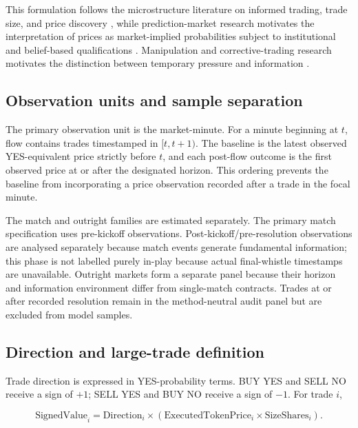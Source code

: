 This formulation follows the microstructure literature on informed trading, trade size, and price discovery \citep{kyle1985continuous,easleyohara1987tradesize,hasbrouck1991information,madhavan1997prices}, while prediction-market research motivates the interpretation of prices as market-implied probabilities subject to institutional and belief-based qualifications \citep{wolferszitzewitz2004prediction,manski2006interpreting}. Manipulation and corrective-trading research motivates the distinction between temporary pressure and information \citep{allengale1992manipulation,camerer1998racetrack,hanson2006aggregation}.

\subsection{Observation units and sample separation}

The primary observation unit is the market-minute. For a minute beginning at
$t$, flow contains trades timestamped in $[t,t+1)$. The baseline is the latest
observed YES-equivalent price strictly before $t$, and each post-flow outcome is
the first observed price at or after the designated horizon. This ordering
prevents the baseline from incorporating a price observation recorded after a
trade in the focal minute.

The match and outright families are estimated separately. The primary match specification uses pre-kickoff observations. Post-kickoff/pre-resolution observations are analysed separately because match events generate fundamental information; this phase is not labelled purely in-play because actual final-whistle timestamps are unavailable. Outright markets form a separate panel because their horizon and information environment differ from single-match contracts. Trades at or after recorded resolution remain in the method-neutral audit panel but are excluded from model samples.

\subsection{Direction and large-trade definition}

Trade direction is expressed in YES-probability terms. BUY YES and SELL NO receive a sign of $+1$; SELL YES and BUY NO receive a sign of $-1$. For trade $i$,

\begin{equation}
  \text{SignedValue}_{i}=\text{Direction}_{i}\times
  \left(\text{ExecutedTokenPrice}_{i}\times\text{SizeShares}_{i}\right).
\end{equation}

